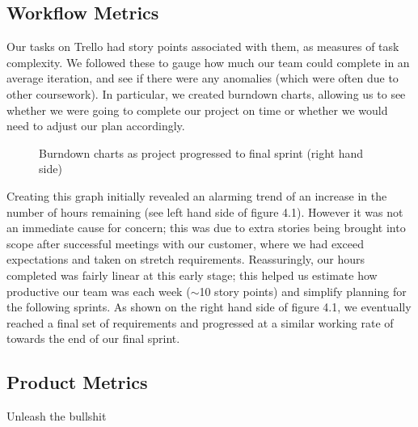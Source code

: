 \subsection{Workflow Metrics}
Our tasks on Trello had story points associated with them, as measures of task complexity. We followed these to gauge how much our team could complete in an average iteration, and see if there were any anomalies (which were often due to other coursework). In particular, we created burndown charts, allowing us to see whether we were going to complete our project on time or whether we would need to adjust our plan accordingly. 

\begin{figure}[h]
\caption{Burndown charts as project progressed to final sprint (right hand side)}
\end{figure}

Creating this graph initially revealed an alarming trend of an increase in the number of hours remaining (see left hand side of figure 4.1). However it was not an immediate cause for concern; this was due to extra stories being brought into scope after successful meetings with our customer, where we had exceed expectations and taken on stretch requirements. Reassuringly, our hours completed was fairly linear at this early stage; this helped us estimate how productive our team was each week ($\sim$10 story points) and simplify planning for the following sprints. As shown on the right hand side of figure 4.1, we eventually reached a final set of requirements and progressed at a similar working rate of towards the end of our final sprint. 

\subsection{Product Metrics}

Unleash the bullshit

